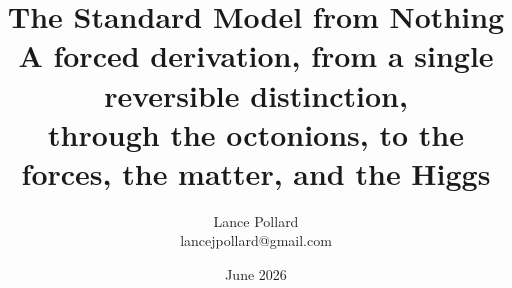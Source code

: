 \onehalfspacing

\theoremheaderfont{\bfseries}
\theorembodyfont{\normalfont}
\newtheorem{definition}{Definition}
\newtheorem{theorem}{Theorem}
\newtheorem{principle}{Principle}
\newtheorem{result}{Result}

\makeatletter
\def\@begintheorem#1#2#3{%
  \par\addvspace{1em}%
  \noindent\textbf{#1 #2.}
  \ifx\@empty#3\relax
    \quad
  \else
    \ \textbf{#3:}
  \fi
  \hspace{0.5em}
}
\def\@endtheorem{\par}
\makeatother

\title{
  {\huge \textbf{The Standard Model from Nothing}} \\[3mm]
  \large A forced derivation, from a single reversible distinction, \\ through the octonions, to the forces, the matter, and the Higgs
}
\author{Lance Pollard \\ \small lancejpollard@gmail.com}
\date{June 2026}
